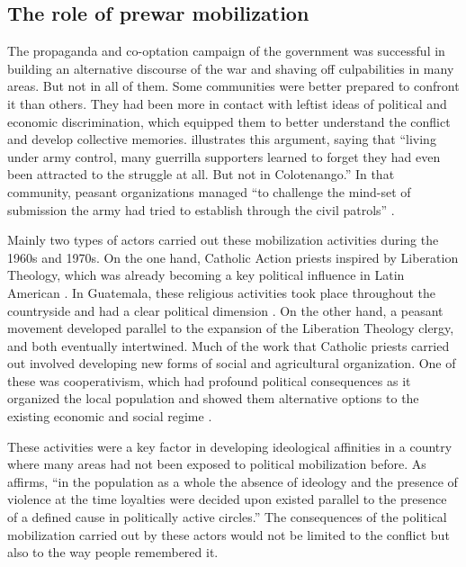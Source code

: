 \documentclass[12pt, notitlepage]{article}
\begin{document}
\subsection*{The role of prewar mobilization}

The propaganda and co-optation campaign of the government was successful in building an alternative discourse of the war and shaving off culpabilities in many areas.
But not in all of them.
Some communities were better prepared to confront it than others.
They had been more in contact with leftist ideas of political and economic discrimination, which equipped them to better understand the conflict and develop collective memories.
\citet[223]{Kobrak:2013aa} illustrates this argument, saying that ``living under army control, many guerrilla supporters learned to forget they had even been attracted to the struggle at all. But not in Colotenango.''
In that community, peasant organizations managed ``to challenge the mind-set of submission the army had tried to establish through the civil patrols'' \citep[226]{Kobrak:2013aa}.

Mainly two types of actors carried out these mobilization activities during the 1960s and 1970s.
On the one hand, Catholic Action priests inspired by Liberation Theology, which was already becoming a key political influence in Latin American \citep[e.g.][]{Wood:2003aa}.
In Guatemala, these religious activities took place throughout the countryside and had a clear political dimension \citep{Carmack:1988aa, Manz:1988aa, Manz:2004aa, LeBot:1992aa, Bateson:2013aa}.
On the other hand, a peasant movement developed parallel to the expansion of the Liberation Theology clergy, and both eventually intertwined.
Much of the work that Catholic priests carried out involved developing new forms of social and agricultural organization.
One of these was cooperativism, which had profound political consequences as it organized the local population and showed them alternative options to the existing economic and social regime \citep{Arias:1992aa, Nelson:2009aa, Bateson:2013aa}.

These activities were a key factor in developing ideological affinities in a country where many areas had not been exposed to political mobilization before.
As \citet[84]{Lofving:2005aa} affirms, ``in the population as a whole the absence of ideology and the presence of violence at the time loyalties were decided upon existed parallel to the presence of a defined cause in politically active circles.''
The consequences of the political mobilization carried out by these actors would not be limited to the conflict but also to the way people remembered it.
\end{document}
